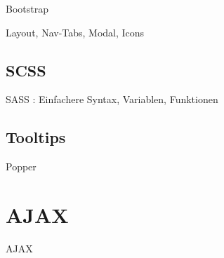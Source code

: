 Bootstrap

Layout, Nav-Tabs, Modal, Icons

\subsection{SCSS}

SASS \cite{sass}: Einfachere Syntax, Variablen, Funktionen

\subsection{Tooltips}

Popper \cite{popperjs}

\section{AJAX}

AJAX \cite{garrett2005ajax}

\begin{figure}[H]
    \centering
    \setlength{\fboxsep}{10pt}\color{black!20}
    \normalcolor
\end{figure}

\begin{figure}[H]
    \centering
    \setlength{\fboxsep}{10pt}\color{black!20}
    \normalcolor\caption{\cite{garrett2005ajax}}
\end{figure}


